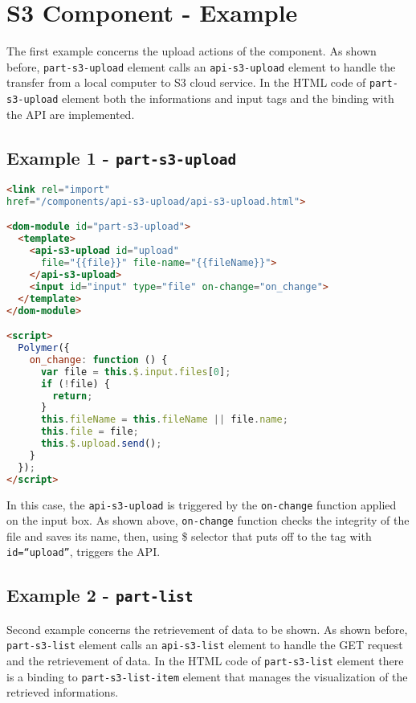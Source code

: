 \section{S3 Component - Example}
\label{sec:S3_exmpl}

The first example concerns the upload actions of the component.
As shown before, \texttt{part-s3-upload} element calls an \texttt{api-s3-upload} element to handle the transfer from a local computer to S3 cloud service.
In the HTML code of \texttt{part-s3-upload} element both the informations and input tags and the binding with the API are implemented.

\subsection{Example 1 - \texttt{part-s3-upload}}

\begin{lstlisting}[language=html]
<link rel="import"
href="/components/api-s3-upload/api-s3-upload.html">

<dom-module id="part-s3-upload">
  <template>
    <api-s3-upload id="upload"
      file="{{file}}" file-name="{{fileName}}">
    </api-s3-upload>
    <input id="input" type="file" on-change="on_change">
  </template>
</dom-module>

<script>
  Polymer({
    on_change: function () {
      var file = this.$.input.files[0];
      if (!file) {
        return;
      }
      this.fileName = this.fileName || file.name;
      this.file = file;
      this.$.upload.send();
    }
  });
</script>

\end{lstlisting}

In this case, the \texttt{api-s3-upload} is triggered by the \texttt{on-change} function applied on the input box. As shown above, \texttt{on-change} function checks the integrity of the file and saves its name, then, using \$ selector that puts off to the tag with \texttt{id=``upload''}, triggers the API.

\subsection{Example 2 - \texttt{part-list}}

Second example concerns the retrievement of data to be shown.
As shown before, \texttt{part-s3-list} element calls an \texttt{api-s3-list} element to handle the GET request and the retrievement of data.
In the HTML code of \texttt{part-s3-list} element there is a binding to \texttt{part-s3-list-item} element that manages the visualization of the retrieved informations.


